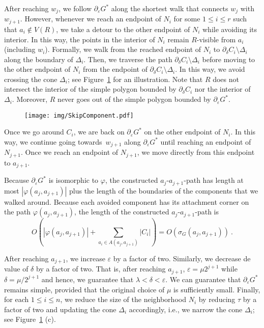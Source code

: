 \documentclass[a4paper, 11pt]{article}
\begin{document}
After reaching $w_j$, we follow $\partial_\varepsilon G^*$ along the shortest walk that connects $w_j$ with $w_{j+1}$. 
However, whenever we reach an endpoint of $N_i$ for some $1\leq i\leq r$ such that $a_i\notin V(R)$, we take a detour to the other endpoint of $N_i$ while avoiding its interior. 
In this way, the points in the interior of $N_i$ remain $R$-visible from $a_i$ (including $w_i$). Formally, we walk from the reached endpoint of $N_i$ to $\partial_\delta C_i\setminus \Delta_i$ along the boundary of $\Delta_i$. Then, we traverse the path $\partial_\delta C_i\setminus \Delta_i$ before moving to the other endpoint of $N_i$ from the endpoint of $\partial_\delta C_i \setminus \Delta_i$. In this way, we avoid crossing the cone $\Delta_i$; see Figure~\ref{fig:Skip Component} for an illustration. 
Note that $R$ does not intersect the interior of the simple polygon bounded by $\partial_\delta C_i$ nor the interior of $\Delta_i$.
Moreover, $R$ never goes out of the simple polygon bounded by $\partial_\varepsilon G^*$.

\begin{figure}[tb]
\centering
\texttt{[image: img/SkipComponent.pdf]}
\caption{\small }
\label{fig:Skip Component}
\end{figure}

Once we go around $C_i$, we are back on $\partial_\varepsilon G^*$ on the other endpoint of $N_i$. In this way, we continue going towards~$w_{j+1}$ along $\partial_\varepsilon G^*$ until reaching an endpoint of $N_{j+1}$.
Once we reach an endpoint of $N_{j+1}$, we move directly from this endpoint to $a_{j+1}$.

Because $\partial_\varepsilon G^*$ is isomorphic to $\varphi$, the constructed $a_j$-$a_{j+1}$-path has length at most $|\varphi(a_j, a_{j+1})|$ plus the length of the boundaries of the components that we walked around. 
Because each avoided component has its attachment corner on the path $\varphi(a_j, a_{j+1})$, the length of the constructed $a_j$-$a_{j+1}$-path is $$O(|\varphi(a_j, a_{j+1})| + \sum_{a_i\in A(a_j, a_{j+1})} |C_i|) = O(\sigma_G(a_j, a_{j+1}))\ .$$

After reaching $a_{j+1}$, we increase $\varepsilon$ by a factor of two. Similarly, we decrease de value of $\delta$ by a factor of two. That is, after reaching $a_{j+1}$, $\varepsilon = \mu 2^{j+1}$ while $\delta = \mu/2^{j+1}$ and hence, we guarantee that $\lambda < \delta < \varepsilon$.
We can guarantee that $\partial_\varepsilon G^*$ remains simple, provided that the original choice of $\mu$ is sufficiently small. 
Finally, for each $1\leq i\leq n$, we reduce the size of the neighborhood $N_i$ by reducing $\tau$ by a factor of two and updating the cone $\Delta_i$ accordingly, i.e., we narrow the cone $\Delta_i$; see Figure~\ref{fig:Skip Component} (c). 
\end{document}
